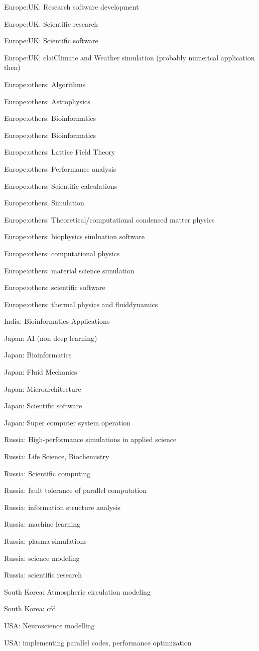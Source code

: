 \item Europe:UK: Research software development
\item Europe:UK: Scientific research
\item Europe:UK: Scientific software
\item Europe:UK: claiClimate and Weather simulation (probably numerical application then)
\item Europe:others: Algorithms
\item Europe:others: Astrophysics
\item Europe:others: Bioinformatics
\item Europe:others: Bioinformatics
\item Europe:others: Lattice Field Theory
\item Europe:others: Performance analysis
\item Europe:others: Scientific calculations
\item Europe:others: Simulation
\item Europe:others: Theoretical/computational condensed matter physics
\item Europe:others: biophysics simluation software
\item Europe:others: computational physics
\item Europe:others: material science simulation
\item Europe:others: scientific software
\item Europe:others: thermal physics and fluiddynamics
\item India: Bioinformatics Applications
\item Japan: AI (non deep learning)
\item Japan: Bioinformatics
\item Japan: Fluid Mechanics
\item Japan: Microarchitecture
\item Japan: Scientific software
\item Japan: Super computer system operation
\item Russia: High-performance simulations in applied science
\item Russia: Life Science, Biochemistry
\item Russia: Scientific computing
\item Russia: fault tolerance of parallel computation
\item Russia: information structure analysis
\item Russia: machine learning
\item Russia: plasma simulations
\item Russia: science modeling
\item Russia: scientific research
\item South Korea: Atmospheric circulation modeling
\item South Korea: cfd
\item USA: Neuroscience modelling
\item USA: implementing parallel codes, performance optimization
